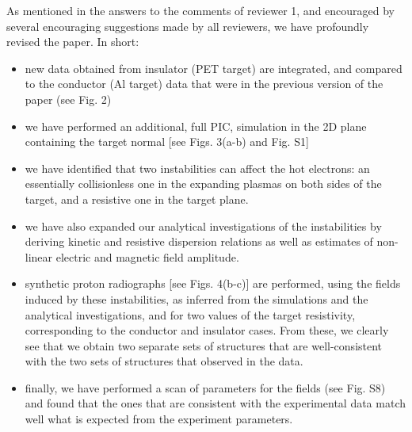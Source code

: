 \documentclass[aps,showpacs,superscriptaddress]{revtex4}%
\begin{document}
\begin{enumerate}
As mentioned in the answers to the comments of reviewer 1, and encouraged by several encouraging suggestions made by all reviewers, we have profoundly revised the paper. In short:
\begin{itemize}
    \item new data obtained from insulator (PET target) are integrated, and compared to the conductor (Al target) data that were in the previous version of the paper (see Fig. 2)
    \item we have performed an additional, full PIC, simulation in the 2D plane containing the target normal [see Figs. 3(a-b) and Fig. S1]
    \item we have identified that two instabilities can affect the hot electrons: an essentially  collisionless one in the expanding plasmas on both sides of the target, and a resistive one in the target plane. 
    \item we have also expanded our analytical investigations of the instabilities by deriving kinetic and resistive dispersion relations as well as  estimates of    non-linear electric and magnetic field amplitude.
    \item synthetic proton radiographs [see Figs. 4(b-c)] are performed, using the fields induced by these instabilities, as inferred from the simulations and the analytical investigations, and for two values of the target resistivity, corresponding to the conductor and insulator cases. From these, we clearly see that we obtain two separate sets of structures that are well-consistent with the two sets of structures that observed in the data. 
    \item finally, we have performed a scan of parameters for the fields (see Fig. S8) and found that the ones that are consistent with the experimental data match well what is expected from the experiment parameters. 
\end{itemize}


\end{enumerate}
\end{document}
